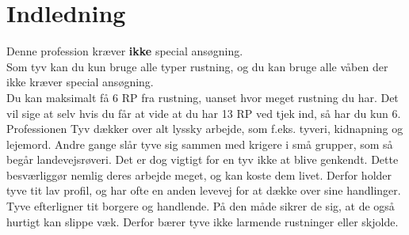 \chapter{Indledning}

Denne profession kræver \textbf{ikke} special ansøgning.\\
Som tyv kan du kun bruge alle typer rustning, og du kan bruge alle våben der ikke kræver special ansøgning.\\
Du kan maksimalt få 6 RP fra rustning, uanset hvor meget rustning du har. Det vil sige at selv hvis du får at vide at du har 13 RP ved tjek ind, så har du kun 6.\\

Professionen Tyv dækker over alt lyssky arbejde, som f.eks. tyveri, kidnapning og lejemord. Andre
gange slår tyve sig sammen med krigere i små grupper, som så begår landevejsrøveri. Det er dog vigtigt for en tyv ikke at blive genkendt. Dette besværliggør nemlig deres arbejde meget, og kan koste dem livet. Derfor holder tyve tit lav profil, og har ofte en anden levevej for at dække over sine handlinger.\\
Tyve efterligner tit borgere og handlende. På den måde sikrer de sig, at de også hurtigt
kan slippe væk. Derfor bærer tyve ikke larmende rustninger eller skjolde.\\

